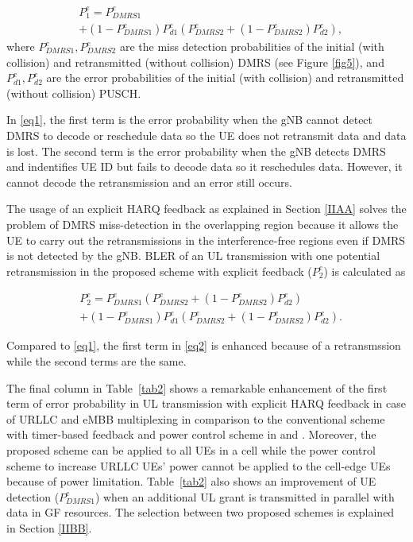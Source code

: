 \documentclass[conference]{IEEEtran}
\begin{document}
\begin{equation}
\begin{split}
 &P^{e}_{1} = P^{e}_{DMRS1} \\
        &+ (1-P^{e}_{DMRS1})P^{e}_{d1}(P^{e}_{DMRS2} + (1-P^{e}_{DMRS2})P^{e}_{d2}),\label{eq1}   
\end{split}
\end{equation}
where $ P^{e}_{DMRS1}, P^{e}_{DMRS2}$ are the miss detection probabilities of the initial (with collision) and retransmitted (without collision) DMRS (see Figure \ref{fig5}), and $P^{e}_{d1}, P^{e}_{d2}$ are the error probabilities of the initial (with collision) and retransmitted (without collision) PUSCH.

In \eqref{eq1}, the first term is the error probability when the gNB cannot detect DMRS to decode or reschedule data so the UE does not retransmit data and data is lost. The second term is the error probability when the gNB detects DMRS and indentifies UE ID but fails to decode data so it reschedules data. However, it cannot decode the retransmission and an error still occurs.

The usage of an explicit HARQ feedback as explained in Section \ref{IIAA} solves the problem of DMRS miss-detection in the overlapping region because it allows the UE to carry out the retransmissions in the interference-free regions even if DMRS is not detected by the gNB. BLER of an UL transmission with one potential retransmission in the proposed scheme with explicit feedback ($ P^{e}_{2}$) is calculated as\useshortskip

\begin{equation}
\begin{split}
 &P^{e}_{2} = P^{e}_{DMRS1}(P^{e}_{DMRS2} + (1-P^{e}_{DMRS2})P^{e}_{d2}) \\
        &+ (1-P^{e}_{DMRS1})P^{e}_{d1}(P^{e}_{DMRS2} + (1-P^{e}_{DMRS2})P^{e}_{d2}).\label{eq2}   
\end{split}
\end{equation}

Compared to \eqref{eq1}, the first term in \eqref{eq2} is enhanced because of a retransmssion while the second terms are the same.

The final column in Table~\ref{tab2} shows a remarkable enhancement of the first term of error probability in UL transmission with explicit HARQ feedback in case of URLLC and eMBB multiplexing in comparison to the conventional scheme with timer-based feedback and power control scheme in \cite{b2} and \cite{b3}. Moreover, the proposed scheme can be applied to all UEs in a cell while the power control scheme to increase URLLC UEs' power cannot be applied to the cell-edge UEs because of power limitation. Table~\ref{tab2} also shows an improvement of UE detection ($P^{e}_{DMRS1}$) when an additional UL grant is transmitted in parallel with data in GF resources. The selection between two proposed schemes is explained in Section \ref{IIBB}.
 
\end{document}
